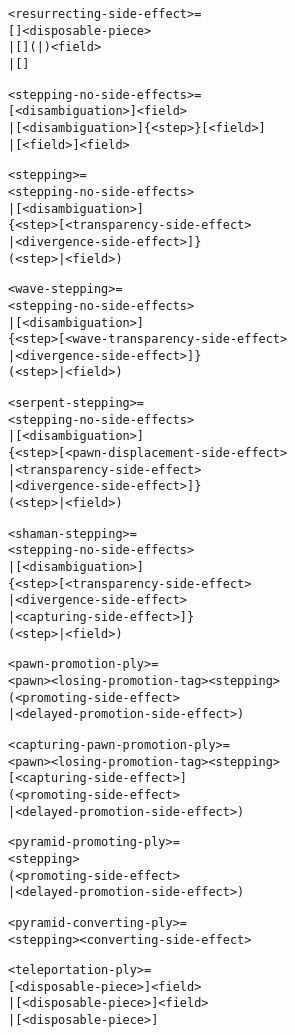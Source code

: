 \clearpage %

\begin{alltt}
<resurrecting-side-effect> =
  \alg{$}[\alg{$}]<disposable-piece>
| \alg{$}[\alg{$}](|)<field>
| [\alg{$$$}]

<stepping-no-side-effects> =
  [<disambiguation>]<field>
| [<disambiguation>]\{<step>\}[\alg{-}<field>]
| [<field>\alg{-}]<field>

<stepping> =
  <stepping-no-side-effects>
| [<disambiguation>]
  \{<step>[<transparency-side-effect>
          | <divergence-side-effect>]\}
  (<step> | \alg{-}<field>)

<wave-stepping> =
  <stepping-no-side-effects>
| [<disambiguation>]
  \{<step>[<wave-transparency-side-effect>
          | <divergence-side-effect>]\}
  (<step> | \alg{-}<field>)

<serpent-stepping> =
  <stepping-no-side-effects>
| [<disambiguation>]
  \{<step>[<pawn-displacement-side-effect>
          | <transparency-side-effect>
          | <divergence-side-effect>]\}
  (<step> | \alg{-}<field>)

\end{alltt}

\clearpage %

\begin{alltt}
<shaman-stepping> =
  <stepping-no-side-effects>
| [<disambiguation>]
  \{<step>[<transparency-side-effect>
          | <divergence-side-effect>
          | <capturing-side-effect>]\}
  (<step> | \alg{-}<field>)

<pawn-promotion-ply> =
  <pawn><losing-promotion-tag><stepping>
  (<promoting-side-effect>
   | <delayed-promotion-side-effect>)

<capturing-pawn-promotion-ply> =
  <pawn><losing-promotion-tag><stepping>
  [<capturing-side-effect>]
  (<promoting-side-effect>
   | <delayed-promotion-side-effect>)

<pyramid-promoting-ply> =
  <stepping>
  (<promoting-side-effect>
   | <delayed-promotion-side-effect>)

<pyramid-converting-ply> =
  <stepping><converting-side-effect>

<teleportation-ply> =
  \alg{|}[<disposable-piece>]<field>
| \alg{||}[<disposable-piece>]<field>
| \alg{|||}[<disposable-piece>]
\end{alltt}

\clearpage %


